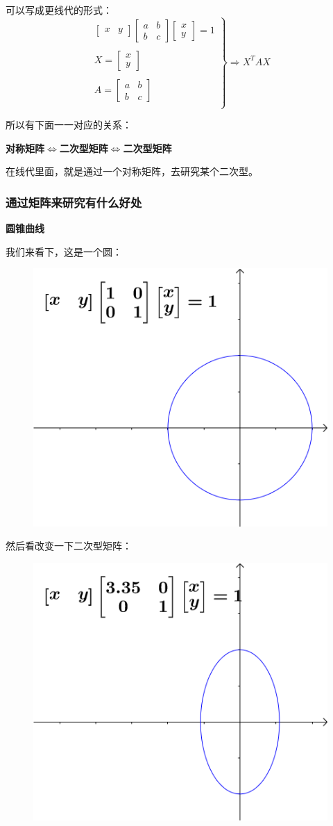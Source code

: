 \documentclass[12pt]{article}
\begin{document}
可以写成更线代的形式：
$$
\left.
\begin{matrix}
\begin{bmatrix}x & y\end{bmatrix}
\begin{bmatrix}a&b\\b&c\end{bmatrix}
\begin{bmatrix}x \\ y\end{bmatrix} = 1 \\
\\
X =  \begin{bmatrix}x \\ y\end{bmatrix}\\
\\
A = \begin{bmatrix}a&b\\b&c\end{bmatrix} \\
\end{matrix}
\right\}
\Rightarrow X^TAX
$$

所以有下面一一对应的关系：
\begin{center}
\textbf{对称矩阵$\Longleftrightarrow$二次型矩阵$\Longleftrightarrow$二次型矩阵}
\end{center}

在线代里面，就是通过一个对称矩阵，去研究某个二次型。

\subsubsection{通过矩阵来研究有什么好处}
\textbf{圆锥曲线}

我们来看下，这是一个圆：
\begin{figure}[H]
    \centering
    \includegraphics[width=.3\textwidth]{fig/UnderstandQuadraticForm_3.png}
\end{figure} 

然后看改变一下二次型矩阵：
\begin{figure}[H]
    \centering
    \includegraphics[width=.3\textwidth]{fig/UnderstandQuadraticForm_4.png}
\end{figure} 
\end{document}
